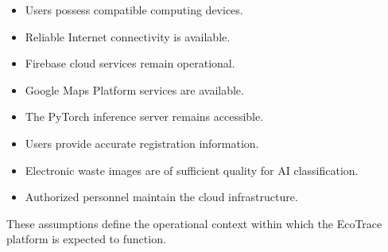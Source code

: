 \begin{itemize}

\item Users possess compatible computing devices.

\item Reliable Internet connectivity is available.

\item Firebase cloud services remain operational.

\item Google Maps Platform services are available.

\item The PyTorch inference server remains accessible.

\item Users provide accurate registration information.

\item Electronic waste images are of sufficient quality for AI
classification.

\item Authorized personnel maintain the cloud infrastructure.

\end{itemize}

These assumptions define the operational context within which the
EcoTrace platform is expected to function.

